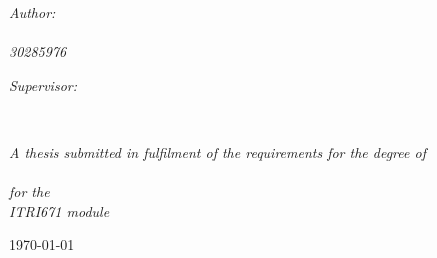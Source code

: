 \documentclass[
12pt, %
oneside, %
english, %
onehalfspacing, %
headsepline, %
]{MastersDoctoralThesis} %
\begin{document}
\begin{titlepage}
\begin{center}
\begin{minipage}[t]{0.4\textwidth}
\begin{flushleft} \large
\emph{Author:}\\
\href{mailto:joshua.esterhuizen27@gmail.com}{\authorname} \\ %
\textit{30285976}
\end{flushleft}
\end{minipage}
\begin{minipage}[t]{0.4\textwidth}
\begin{flushright} \large
\emph{Supervisor:} \\
\href{mailto:Gunther.Drevin@nwu.ac.za}{\supname} %
\end{flushright}
\end{minipage}\\[3cm]
 
\vfill

\large \textit{A thesis submitted in fulfilment of the requirements for the degree of \\ \degreename}\\[0.3cm] %
\large \textit{for the}\\
\large \textit{ITRI671 module}\\
\vfill

{\large \today}\\[4cm] %
 
\vfill
\end{center}
\end{titlepage}

\end{document}
